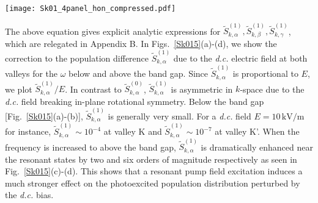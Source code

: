 \documentclass[reprint,amsmath,amssymb,aps,prb]{revtex4-1}
\begin{document}
%
\begin{figure*}[htb]
  \texttt{[image: Sk01\_4panel\_hon\_compressed.pdf]}
  \caption{(Color online). First-order correction to the population difference $\tilde{S}_{k,\alpha}^{(1)}/E$ scaled by the \textit{d.c.} bias field $E$ between the conduction and valence bands at valley K and K' for (a)-(b) $\omega=1.4$ eV and (c)-(d) $\omega= 1.74$ eV. The labels for the K and K' valleys are indicated above the plots. The pump field has the same helicity and strength, and the values of $\Gamma,\Gamma_\perp,\Delta$ are the same as in Fig.~\ref{Sk014}.}
\label{Sk015}
\end{figure*}
%

The above equation gives explicit analytic expressions for $\tilde{S}_{k,\alpha}^{(1)}, \tilde{S}_{k,\beta}^{(1)}, \tilde{S}_{k,\gamma}^{(1)}$, which are relegated in Appendix B.
In Figs.~\ref{Sk015}(a)-(d), we show the correction to the population difference $\tilde{S}_{k,\alpha}^{(1)}$ due to the \textit{d.c.} electric field at both valleys for the $\omega$ below and above the band gap. Since $\tilde{S}_{k,\alpha}^{(1)}$ is proportional to $E$, we plot $\tilde{S}_{k,\alpha}^{(1)}/E$. In contrast to $\tilde{S}_{k,\alpha}^{(0)}$, $\tilde{S}_{k,\alpha}^{(1)}$ is asymmetric in $k$-space due to  the \textit{d.c.} field breaking in-plane rotational symmetry. Below the band gap [Fig.~\ref{Sk015}(a)-(b)], $\tilde{S}_{k,\alpha}^{(1)}$ is generally very small. For a \textit{d.c.} field $E = 10\,\mathrm{kV/m}$ for instance, $\tilde{S}_{k,\alpha}^{(1)} \sim 10^{-4}$ at valley K and $\tilde{S}_{k,\alpha}^{(1)} \sim 10^{-7}$ at valley K'. When the frequency is increased to above the band gap, $\tilde{S}_{k,\alpha}^{(1)}$ is dramatically enhanced near the resonant states by two and six orders of magnitude respectively as seen in Fig.~\ref{Sk015}(c)-(d). 
This shows that a resonant pump field excitation induces a much stronger effect on the photoexcited population distribution perturbed by the \textit{d.c.} bias. 
\end{document}

